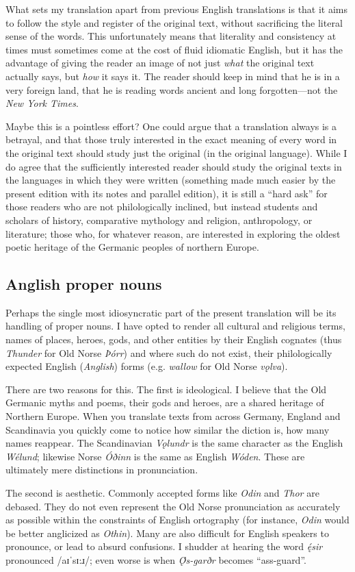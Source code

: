     What sets my translation apart from previous English translations is that it aims to follow the style and register of the original text, without sacrificing the literal sense of the words.  This unfortunately means that literality and consistency at times must sometimes come at the cost of fluid idiomatic English, but it has the advantage of giving the reader an image of not just \emph{what} the original text actually says, but \emph{how} it says it.  The reader should keep in mind that he is in a very foreign land, that he is reading words ancient and long forgotten—not the \emph{New York Times}.

    Maybe this is a pointless effort? One could argue that a translation always is a betrayal, and that those truly interested in the exact meaning of every word in the original text should study just the original (in the original language).  While I do agree that the sufficiently interested reader should study the original texts in the languages in which they were written (something made much easier by the present edition with its notes and parallel edition), it is still a “hard ask” for those readers who are not philologically inclined, but instead students and scholars of history, comparative mythology and religion, anthropology, or literature; those who, for whatever reason, are interested in exploring the oldest poetic heritage of the Germanic peoples of northern Europe.

    \subsection{Anglish proper nouns}
      Perhaps the single most idiosyncratic part of the present translation will be its handling of proper nouns. I have opted to render all cultural and religious terms, names of places, heroes, gods, and other entities by their English cognates (thus \emph{Thunder} for Old Norse \emph{Þórr}) and where such do not exist, their philologically expected English (\emph{Anglish}) forms (e.g. \emph{wallow} for Old Norse \emph{vǫlva}).

      There are two reasons for this.  The first is ideological.  I believe that the Old Germanic myths and poems, their gods and heroes, are a shared heritage of Northern Europe.  When you translate texts from across Germany, England and Scandinavia you quickly come to notice how similar the diction is, how many names reappear. The Scandinavian \emph{Vǫlundr} is the same character as the English \emph{Wélund}; likewise Norse \emph{Óðinn} is the same as English \emph{Wóden}.  These are ultimately mere distinctions in pronunciation.

      The second is aesthetic.  Commonly accepted forms like \emph{Odin} and \emph{Thor} are debased.  They do not even represent the Old Norse pronunciation as accurately as possible within the constraints of English ortography (for instance, \emph{Odin} would be better anglicized as \emph{Othin}).  Many are also difficult for English speakers to pronounce, or lead to absurd confusions.  I shudder at hearing the word \emph{ę́sir} pronounced /aɪˈsɪ:ɹ/; even worse is when \emph{Ǫ́s-garðr} becomes “ass-guard”.
